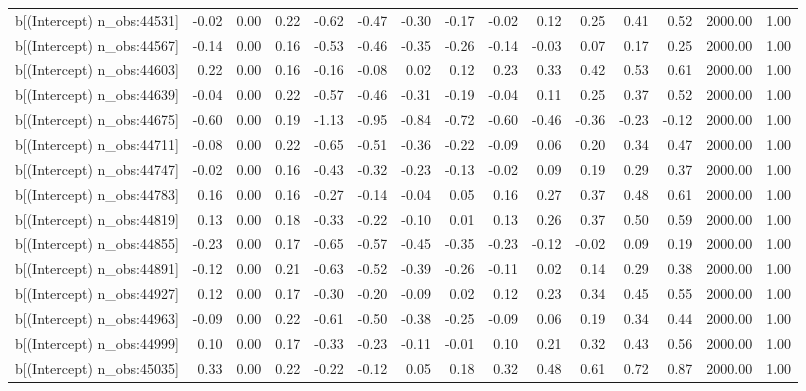 \begin{table}[ht]
\begin{tabular}{rrrrrrrrrrrrrrr}
  b[(Intercept) n\_obs:44531] & -0.02 & 0.00 & 0.22 & -0.62 & -0.47 & -0.30 & -0.17 & -0.02 & 0.12 & 0.25 & 0.41 & 0.52 & 2000.00 & 1.00 \\ 
  b[(Intercept) n\_obs:44567] & -0.14 & 0.00 & 0.16 & -0.53 & -0.46 & -0.35 & -0.26 & -0.14 & -0.03 & 0.07 & 0.17 & 0.25 & 2000.00 & 1.00 \\ 
  b[(Intercept) n\_obs:44603] & 0.22 & 0.00 & 0.16 & -0.16 & -0.08 & 0.02 & 0.12 & 0.23 & 0.33 & 0.42 & 0.53 & 0.61 & 2000.00 & 1.00 \\ 
  b[(Intercept) n\_obs:44639] & -0.04 & 0.00 & 0.22 & -0.57 & -0.46 & -0.31 & -0.19 & -0.04 & 0.11 & 0.25 & 0.37 & 0.52 & 2000.00 & 1.00 \\ 
  b[(Intercept) n\_obs:44675] & -0.60 & 0.00 & 0.19 & -1.13 & -0.95 & -0.84 & -0.72 & -0.60 & -0.46 & -0.36 & -0.23 & -0.12 & 2000.00 & 1.00 \\ 
  b[(Intercept) n\_obs:44711] & -0.08 & 0.00 & 0.22 & -0.65 & -0.51 & -0.36 & -0.22 & -0.09 & 0.06 & 0.20 & 0.34 & 0.47 & 2000.00 & 1.00 \\ 
  b[(Intercept) n\_obs:44747] & -0.02 & 0.00 & 0.16 & -0.43 & -0.32 & -0.23 & -0.13 & -0.02 & 0.09 & 0.19 & 0.29 & 0.37 & 2000.00 & 1.00 \\ 
  b[(Intercept) n\_obs:44783] & 0.16 & 0.00 & 0.16 & -0.27 & -0.14 & -0.04 & 0.05 & 0.16 & 0.27 & 0.37 & 0.48 & 0.61 & 2000.00 & 1.00 \\ 
  b[(Intercept) n\_obs:44819] & 0.13 & 0.00 & 0.18 & -0.33 & -0.22 & -0.10 & 0.01 & 0.13 & 0.26 & 0.37 & 0.50 & 0.59 & 2000.00 & 1.00 \\ 
  b[(Intercept) n\_obs:44855] & -0.23 & 0.00 & 0.17 & -0.65 & -0.57 & -0.45 & -0.35 & -0.23 & -0.12 & -0.02 & 0.09 & 0.19 & 2000.00 & 1.00 \\ 
  b[(Intercept) n\_obs:44891] & -0.12 & 0.00 & 0.21 & -0.63 & -0.52 & -0.39 & -0.26 & -0.11 & 0.02 & 0.14 & 0.29 & 0.38 & 2000.00 & 1.00 \\ 
  b[(Intercept) n\_obs:44927] & 0.12 & 0.00 & 0.17 & -0.30 & -0.20 & -0.09 & 0.02 & 0.12 & 0.23 & 0.34 & 0.45 & 0.55 & 2000.00 & 1.00 \\ 
  b[(Intercept) n\_obs:44963] & -0.09 & 0.00 & 0.22 & -0.61 & -0.50 & -0.38 & -0.25 & -0.09 & 0.06 & 0.19 & 0.34 & 0.44 & 2000.00 & 1.00 \\ 
  b[(Intercept) n\_obs:44999] & 0.10 & 0.00 & 0.17 & -0.33 & -0.23 & -0.11 & -0.01 & 0.10 & 0.21 & 0.32 & 0.43 & 0.56 & 2000.00 & 1.00 \\ 
  b[(Intercept) n\_obs:45035] & 0.33 & 0.00 & 0.22 & -0.22 & -0.12 & 0.05 & 0.18 & 0.32 & 0.48 & 0.61 & 0.72 & 0.87 & 2000.00 & 1.00 \\ 

\end{tabular}
\end{table}
